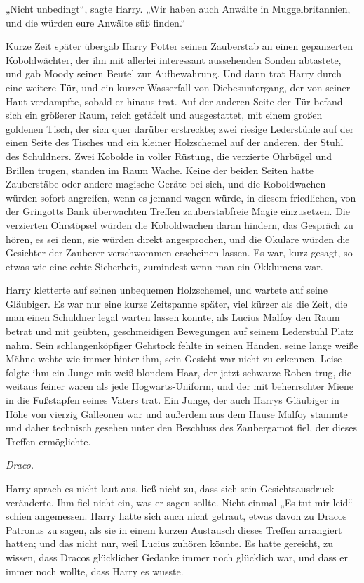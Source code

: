 {„Nicht unbedingt“, sagte Harry. „Wir haben auch Anwälte in Muggelbritannien, und die würden eure Anwälte süß finden.“

Kurze Zeit später übergab Harry Potter seinen Zauberstab an einen gepanzerten Koboldwächter, der ihn mit allerlei interessant aussehenden Sonden abtastete, und gab Moody seinen Beutel zur Aufbewahrung. Und dann trat Harry durch eine weitere Tür, und ein kurzer Wasserfall von Diebesuntergang, der von seiner Haut verdampfte, sobald er hinaus trat. Auf der anderen Seite der Tür befand sich ein größerer Raum, reich getäfelt und ausgestattet, mit einem großen goldenen Tisch, der sich quer darüber erstreckte; zwei riesige Lederstühle auf der einen Seite des Tisches und ein kleiner Holzschemel auf der anderen, der Stuhl des Schuldners. Zwei Kobolde in voller Rüstung, die verzierte Ohrbügel und Brillen trugen, standen im Raum Wache. Keine der beiden Seiten hatte Zauberstäbe oder andere magische Geräte bei sich, und die Koboldwachen würden sofort angreifen, wenn es jemand wagen würde, in diesem friedlichen, von der Gringotts Bank überwachten Treffen zauberstabfreie Magie einzusetzen. Die verzierten Ohrstöpsel würden die Koboldwachen daran hindern, das Gespräch zu hören, es sei denn, sie würden direkt angesprochen, und die Okulare würden die Gesichter der Zauberer verschwommen erscheinen lassen. Es war, kurz gesagt, so etwas wie eine echte Sicherheit, zumindest wenn man ein Okklumens war.

Harry kletterte auf seinen unbequemen Holzschemel, und wartete auf seine Gläubiger. Es war nur eine kurze Zeitspanne später, viel kürzer als die Zeit, die man einen Schuldner legal warten lassen konnte, als Lucius Malfoy den Raum betrat und mit geübten, geschmeidigen Bewegungen auf seinem Lederstuhl Platz nahm. Sein schlangenköpfiger Gehstock fehlte in seinen Händen, seine lange weiße Mähne wehte wie immer hinter ihm, sein Gesicht war nicht zu erkennen. Leise folgte ihm ein Junge mit weiß-blondem Haar, der jetzt schwarze Roben trug, die weitaus feiner waren als jede Hogwarts-Uniform, und der mit beherrschter Miene in die Fußstapfen seines Vaters trat. Ein Junge, der auch Harrys Gläubiger in Höhe von vierzig Galleonen war und außerdem aus dem Hause Malfoy stammte und daher technisch gesehen unter den Beschluss des Zaubergamot fiel, der dieses Treffen ermöglichte.

\emph{Draco.}

Harry sprach es nicht laut aus, ließ nicht zu, dass sich sein Gesichtsausdruck veränderte. Ihm fiel nicht ein, was er sagen sollte. Nicht einmal „Es tut mir leid“ schien angemessen. Harry hatte sich auch nicht getraut, etwas davon zu Dracos Patronus zu sagen, als sie in einem kurzen Austausch dieses Treffen arrangiert hatten; und das nicht nur, weil Lucius zuhören könnte. Es hatte gereicht, zu wissen, dass Dracos glücklicher Gedanke immer noch glücklich war, und dass er immer noch wollte, dass Harry es wusste.

}
